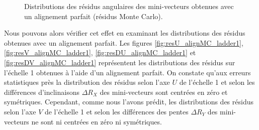   \begin{figure}[htb!]
     \begin{center}
     \end{center}
     \caption{Distributions des r\'esidus angulaires des mini-vecteurs obtenues avec un alignement parfait (r\'esidus Monte Carlo).}
     \label{fig:residus_alignementMC_1}
   \end{figure}
  
  Nous pouvons alors  v\'erifier cet effet en examinant les distributions des r\'esidus obtenues avec un alignement parfait. Les figures \ref{fig:resU_alignMC_ladder1}, \ref{fig:resV_alignMC_ladder1}, \ref{fig:resDU_alignMC_ladder1} et \ref{fig:resDV_alignMC_ladder1} repr\'esentent les distributions des r\'esidus sur l'\'echelle 1 obtenues \`a l'aide d'un alignement parfait. On constate qu'aux erreurs statistiques pr\`es la distribution des r\'esidus selon l'axe $U$ de l'\'echelle 1 et selon les diff\'erences d'inclinaisons $\Delta R_X$ des mini-vecteurs sont centr\'ees en z\'ero et sym\'etriques. Cependant, comme nous l'avons pr\'edit, les distributions des r\'esidus selon l'axe $V$ de l'\'echelle 1 et selon les d\'iff\'erences des pentes $\Delta R_Y$ des mini-vecteurs ne sont ni centr\'ees en z\'ero ni sym\'etriques.
  
